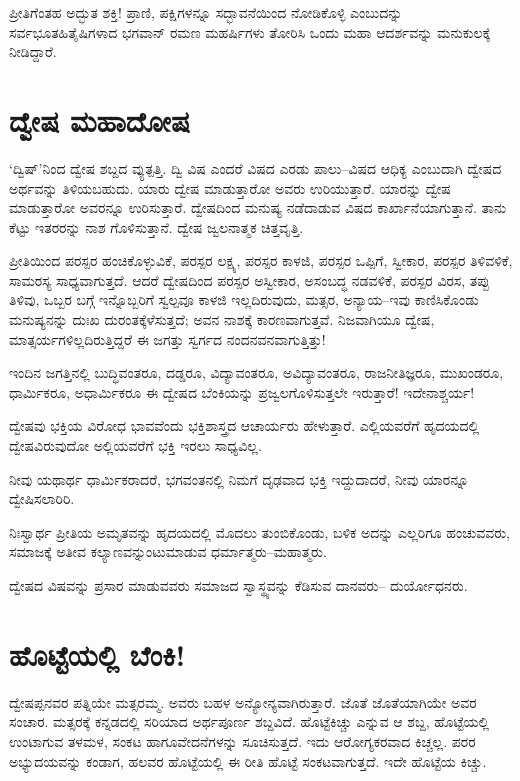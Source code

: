ಪ್ರೀತಿಗೆಂತಹ ಅದ್ಭುತ ಶಕ್ತಿ! ಪ್ರಾಣಿ, ಪಕ್ಷಿಗಳನ್ನೂ ಸದ್ಭಾವನೆಯಿಂದ ನೋಡಿಕೊಳ್ಳಿ ಎಂಬು\-ದನ್ನು ಸರ್ವಭೂತಹಿತೈಷಿಗಳಾದ ಭಗವಾನ್ ರಮಣ ಮಹರ್ಷಿಗಳು ತೋರಿಸಿ ಒಂದು ಮಹಾ ಆದರ್ಶವನ್ನು ಮನುಕುಲಕ್ಕೆ ನೀಡಿದ್ದಾರೆ.


\section*{ದ್ವೇಷ ಮಹಾದೋಷ}


‘ದ್ವಿಷ್​’ನಿಂದ ದ್ವೇಷ ಶಬ್ದದ ವ್ಯುತ್ಪತ್ತಿ. ದ್ವಿ ವಿಷ ಎಂದರೆ ವಿಷದ ಎರಡು ಪಾಲು–ವಿಷದ ಆಧಿಕ್ಯ ಎಂಬುದಾಗಿ ದ್ವೇಷದ ಅರ್ಥವನ್ನು ತಿಳಿಯಬಹುದು. ಯಾರು ದ್ವೇಷ ಮಾಡುತ್ತಾರೋ ಅವರು ಉರಿಯುತ್ತಾರೆ. ಯಾರನ್ನು ದ್ವೇಷ ಮಾಡುತ್ತಾರೋ ಅವರನ್ನೂ ಉರಿಸುತ್ತಾರೆ. ದ್ವೇಷದಿಂದ ಮನುಷ್ಯ ನಡೆದಾಡುವ ವಿಷದ ಕಾರ್ಖಾನೆಯಾಗುತ್ತಾನೆ. ತಾನು ಕೆಟ್ಟು ಇತರರನ್ನು ನಾಶ ಗೊಳಿಸುತ್ತಾನೆ. ದ್ವೇಷ ಜ್ವಲನಾತ್ಮಕ ಚಿತ್ತವೃತ್ತಿ.

ಪ್ರೀತಿಯಿಂದ ಪರಸ್ಪರ ಹಂಚಿಕೊಳ್ಳುವಿಕೆ, ಪರಸ್ಪರ ಲಕ್ಷ್ಯ, ಪರಸ್ಪರ ಕಾಳಜಿ, ಪರಸ್ಪರ ಒಪ್ಪಿಗೆ, ಸ್ವೀಕಾರ, ಪರಸ್ಪರ ತಿಳಿವಳಿಕೆ, ಸಾಮರಸ್ಯ ಸಾಧ್ಯವಾಗುತ್ತದೆ. ಆದರೆ ದ್ವೇಷದಿಂದ ಪರಸ್ಪರ ಅಸ್ವೀಕಾರ, ಅಸಂಬದ್ಧ ನಡವಳಿಕೆ, ಪರಸ್ಪರ ವಿರಸ, ತಪ್ಪು ತಿಳಿವು, ಒಬ್ಬರ ಬಗ್ಗೆ ಇನ್ನೊಬ್ಬರಿಗೆ ಸ್ವಲ್ಪವೂ ಕಾಳಜಿ ಇಲ್ಲದಿರುವುದು, ಮತ್ಸರ, ಅನ್ಯಾಯ–ಇವು ಕಾಣಿಸಿಕೊಂಡು ಮನುಷ್ಯನನ್ನು ದುಃಖ ದುರಂತಕ್ಕೆಳೆಸುತ್ತದೆ; ಅವನ ನಾಶಕ್ಕೆ ಕಾರಣವಾಗುತ್ತವೆ. ನಿಜವಾಗಿಯೂ ದ್ವೇಷ, ಮಾತ್ಸರ್ಯ\-ಗಳಿಲ್ಲದಿರುತ್ತಿದ್ದರೆ ಈ ಜಗತ್ತು ಸ್ವರ್ಗದ ನಂದನವನವಾಗುತ್ತಿತ್ತು!

ಇಂದಿನ ಜಗತ್ತಿನಲ್ಲಿ ಬುದ್ಧಿವಂತರೂ, ದಡ್ಡರೂ, ವಿದ್ಯಾವಂತರೂ, ಅವಿದ್ಯಾವಂತರೂ, ರಾಜ\-ನೀತಿಜ್ಞರೂ, ಮುಖಂಡರೂ, ಧಾರ್ಮಿಕರೂ, ಅಧಾರ್ಮಿಕರೂ ಈ ದ್ವೇಷದ ಬೆಂಕಿಯನ್ನು ಪ್ರಜ್ವಲಗೊಳಿಸುತ್ತಲೇ ಇರುತ್ತಾರೆ! ಇದೇನಾಶ್ಚರ್ಯ!

ದ್ವೇಷವು ಭಕ್ತಿಯ ವಿರೋಧ ಭಾವವೆಂದು ಭಕ್ತಿಶಾಸ್ತ್ರದ ಆಚಾರ್ಯರು ಹೇಳುತ್ತಾರೆ. ಎಲ್ಲಿಯವರೆಗೆ ಹೃದಯದಲ್ಲಿ ದ್ವೇಷವಿರುವುದೋ ಅಲ್ಲಿಯವರೆಗೆ ಭಕ್ತಿ ಇರಲು ಸಾಧ್ಯವಿಲ್ಲ.

ನೀವು ಯಥಾರ್ಥ ಧಾರ್ಮಿಕರಾದರೆ, ಭಗವಂತನಲ್ಲಿ ನಿಮಗೆ ದೃಢವಾದ ಭಕ್ತಿ ಇದ್ದುದಾದರೆ, ನೀವು ಯಾರನ್ನೂ ದ್ವೇಷಿಸಲಾರಿರಿ.

ನಿಃಸ್ವಾರ್ಥ ಪ್ರೀತಿಯ ಅಮೃತವನ್ನು ಹೃದಯದಲ್ಲಿ ಮೊದಲು ತುಂಬಿಕೊಂಡು, ಬಳಿಕ ಅದನ್ನು ಎಲ್ಲರಿಗೂ ಹಂಚುವವರು, ಸಮಾಜಕ್ಕೆ ಅತೀವ ಕಲ್ಯಾಣವನ್ನುಂಟುಮಾಡುವ ಧರ್ಮಾ\-ತ್ಮರು–ಮಹಾತ್ಮರು.

ದ್ವೇಷದ ವಿಷವನ್ನು ಪ್ರಸಾರ ಮಾಡುವವರು ಸಮಾಜದ ಸ್ವಾಸ್ಥ್ಯವನ್ನು ಕೆಡಿಸುವ ದಾನವರು– ದುರ್ಯೋಧನರು.


\section*{ಹೊಟ್ಟೆಯಲ್ಲಿ ಬೆಂಕಿ!}


ದ್ವೇಷಪ್ಪನವರ ಪತ್ನಿಯೇ ಮತ್ಸರಮ್ಮ. ಅವರು ಬಹಳ ಅನ್ಯೋನ್ಯವಾಗಿರುತ್ತಾರೆ. ಜೊತೆ ಜೊತೆಯಾಗಿಯೇ ಅವರ ಸಂಚಾರ. ಮತ್ಸರಕ್ಕೆ ಕನ್ನಡದಲ್ಲಿ ಸರಿಯಾದ ಅರ್ಥಪೂರ್ಣ ಶಬ್ದವಿದೆ. ಹೊಟ್ಟೆಕಿಚ್ಚು ಎನ್ನುವ ಆ ಶಬ್ದ, ಹೊಟ್ಟೆಯಲ್ಲಿ ಉಂಟಾಗುವ ತಳಮಳ, ಸಂಕಟ ಹಾಗೂ\break ವೇದನೆಗಳನ್ನು ಸೂಚಿಸುತ್ತದೆ. ಇದು ಆರೋಗ್ಯಕರವಾದ ಕಿಚ್ಚಲ್ಲ. ಪರರ ಅಭ್ಯುದಯವನ್ನು ಕಂಡಾಗ, ಹಲವರ ಹೊಟ್ಟೆಯಲ್ಲಿ ಈ ರೀತಿ ಹೊಟ್ಟೆ ಸಂಕಟವಾಗುತ್ತದೆ. ಇದೇ ಹೊಟ್ಟೆಯ ಕಿಚ್ಚು.

